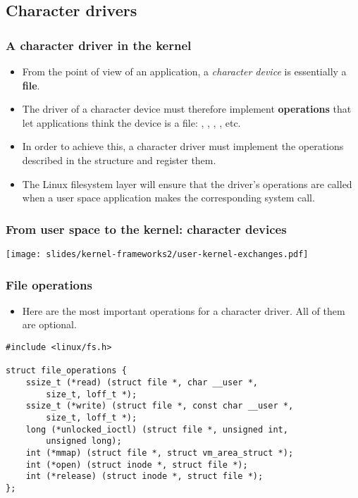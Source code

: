 \subsection{Character drivers}

\begin{frame}
  \frametitle{A character driver in the kernel}
  \begin{itemize}
  \item From the point of view of an application, a {\em character
      device} is essentially a {\bf file}.
  \item The driver of a character device must therefore implement {\bf
      operations} that let applications think the device is a file:
    , , , , etc.
  \item In order to achieve this, a character driver must implement
    the operations described in the 
    structure and register them.
  \item The Linux filesystem layer will ensure that the driver's
    operations are called when a user space application makes the
    corresponding system call.
  \end{itemize}
\end{frame}

\begin{frame}
  \frametitle{From user space to the kernel: character devices}
  \begin{center}
    \texttt{[image: slides/kernel-frameworks2/user-kernel-exchanges.pdf]}
  \end{center}
\end{frame}

\begin{frame}[fragile]
  \frametitle{File operations}
  \begin{itemize}
  \item Here are the most important operations for a character
    driver. All of them are optional.
  \end{itemize}
\begin{verbatim}
#include <linux/fs.h>

struct file_operations {
    ssize_t (*read) (struct file *, char __user *,
        size_t, loff_t *);
    ssize_t (*write) (struct file *, const char __user *,
        size_t, loff_t *);
    long (*unlocked_ioctl) (struct file *, unsigned int,
        unsigned long);
    int (*mmap) (struct file *, struct vm_area_struct *);
    int (*open) (struct inode *, struct file *);
    int (*release) (struct inode *, struct file *);
};
\end{verbatim}
\end{frame}

